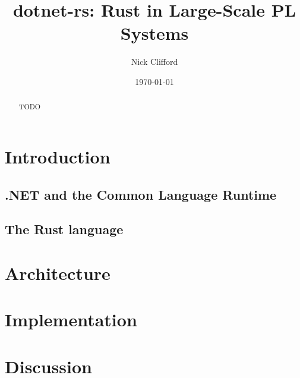\documentclass[12pt]{article}
\title{dotnet-rs: Rust in Large-Scale PL Systems}
\author{Nick Clifford}
\date{\today}
\begin{document}
    \maketitle

    \begin{abstract}
        TODO
    \end{abstract}
    
    \section{Introduction}

    \subsection{.NET and the Common Language Runtime}

    \subsection{The Rust language}

    \section{Architecture}
    
    \section{Implementation}

    \section{Discussion}
\end{document}
